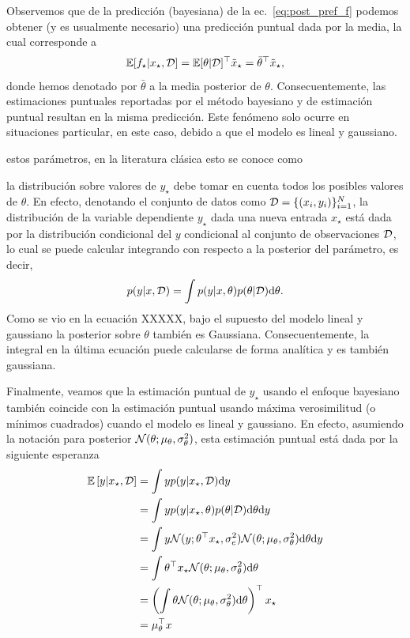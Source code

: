 \begin{remark}\label{rem:predicciones}
Observemos que de la predicción (bayesiana) de la ec.~\eqref{eq:post_pref_f} podemos obtener (y es usualmente necesario) una predicción puntual dada por la media, la cual corresponde a 
\begin{equation}
	\operatorname{\mathbb{E}}[f_\star|x_\star,{\mathcal D}] = \operatorname{\mathbb{E}}[\theta|{\mathcal D}]^\top  \tilde{x}_\star = \bar \theta^\top  \tilde{x}_\star, 
\end{equation}
donde hemos denotado por $\bar \theta$ a la media posterior de $\theta$. Consecuentemente, las estimaciones puntuales reportadas por el método bayesiano y de estimación puntual resultan en la misma predicción. Este fenómeno solo ocurre en situaciones particular, en este caso, debido a que el modelo es lineal y gaussiano. 
\end{remark}


 estos parámetros, en la literatura clásica esto se conoce como 

la distribución sobre valores de $y_\star$ debe tomar en cuenta todos los posibles valores de $\theta$. En efecto, denotando el conjunto de datos como ${\mathcal D}=\{(x_i,y_i)\}_{i=1}^N$, la distribución de la variable dependiente $y_\star$ dada una nueva entrada $x_\star$ está dada por la distribución condicional del $y$ condicional al conjunto de observaciones ${\mathcal D}$, lo cual se puede calcular integrando con respecto a la posterior del parámetro, es decir, 
\begin{equation}
 	p(y|x,{\mathcal D}) = \int p(y|x, \theta)p(\theta|{\mathcal D}) {\text d}\theta.
 \end{equation} 
Como se vio en la ecuación XXXXX, bajo el supuesto del modelo lineal y gaussiano la posterior sobre $\theta$ también es Gaussiana. Consecuentemente, la integral en la última ecuación puede calcularse de forma analítica y es también gaussiana. 

Finalmente, veamos que la estimación puntual de $y_\star$ usando el enfoque bayesiano también coincide con la estimación puntual usando máxima verosimilitud (o mínimos cuadrados) cuando el modelo es lineal y gaussiano. En efecto, asumiendo la notación para posterior ${\mathcal N}(\theta;\mu_\theta, \sigma_\theta^2)$, esta estimación puntual está dada por la siguiente esperanza
\begin{align}
	\operatorname{\mathbb{E}}\left[y|x_\star,{\mathcal D}\right] 
	&= \int y p(y|x_\star,{\mathcal D}) {\text d} y \\
	&= \int y p(y|x_\star, \theta)p(\theta|{\mathcal D}) {\text d} \theta {\text d} y \nonumber\\
	&= \int y {\mathcal N}(y;\theta^\top x_\star ,\sigma_e^2){\mathcal N}(\theta;\mu_\theta, \sigma_\theta^2) {\text d}\theta {\text d} y \nonumber\\
	&= \int \theta^\top x_\star {\mathcal N}(\theta;\mu_\theta, \sigma_\theta^2) {\text d} \theta \nonumber\\
	&= \left(\int \theta {\mathcal N}(\theta;\mu_\theta, \sigma_\theta^2) {\text d} \theta\right)^\top x_\star \nonumber\\
	&= \mu_\theta^\top x \nonumber
\end{align}




